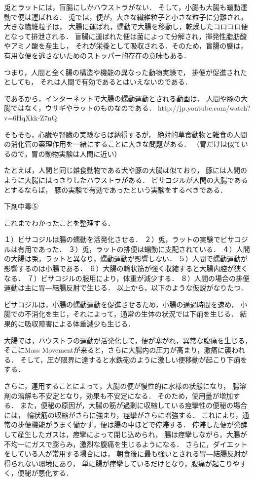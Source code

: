 兎とラットには，盲腸にしかハウストラがない．
そして，小腸も大腸も蠕動運動で便は運ばれる．
兎では，便が，大きな繊維粒子と小さな粒子に分離され，大きな繊維粒子は，
大腸に運ばれ，蠕動で大腸を移動し，乾燥したコロコロ便となって排泄される．
盲腸に運ばれた便は菌によって分解され，揮発性脂肪酸やアミノ酸を産生し，
それが栄養として吸収される．そのため，盲腸の襞は，有用な便を逃さないためのストッパー的存在の意味もある．

つまり，人間と全く腸の構造や機能の異なった動物実験で，
排便が促進されたとしても，
それは人間で有効であるとはいえないのである．

であるから，インターネットで大腸の蠕動運動とされる動画は，
人間や豚の大腸ではなく，ウサギやラットのものなのである．
http://jp.youtube.com/watch?v=6HqXkk-Z7nQ 

そもそも，心臓や腎臓の実験ならば納得するが，
絶対的草食動物と雑食の人間の消化管の薬理作用を一緒にすることに大きな問題がある．
（胃だけは似ているので，胃の動物実験は人間に近い）




たとえば，人間と同じ雑食動物である犬や豚の大腸は似ており，
豚には人間のように大腸にはっきりしたハウストラがある．
ビサコジルが人間の大腸であるとするならば，
豚の実験で有効であったという実験をするべきである．

下剤中毒⑤

これまでわかったことを整理する．

１）ビサコジルは腸の蠕動を活発化させる．
２）兎，ラットの実験でビサコジルは有用であった．
３）兎，ラットの排便は蠕動に支配されている．
４）人間の大腸は兎，ラットと異なり，蠕動運動が影響しない．
５）人間で蠕動運動が影響するのは小腸である．
６）大腸の輪状筋が強く収縮すると大腸内腔が狭くなる．
７）ビサコジルの服用により，体重が減少する．
８）人間の場合の排便運動は主に胃―結腸反射で生じる．
以上から，以下のような仮説がなりたつ．

ビサコジルは，小腸の蠕動運動を促進させるため，小腸の通過時間を速め，
小腸での不消化を生じ，それによって，通常の生体の状況では下痢を生じる．
結果的に吸収障害による体重減少も生じる．

大腸では，ハウストラの運動が活発化して，便が塞がれ，異常な腹痛を生じる，
 そこにMass Movementが来ると，さらに大腸内の圧力が高まり，激痛に襲われる．
そして，圧が限界に達すると水鉄砲のように激しい便移動が起こり下痢をする．

さらに，連用することによって，大腸の便が慢性的に水様の状態になり，
腸溶剤の溶解も不安定となり，効果も不安定になる．
そのため，使用量が増加する．
また，便秘の原因が，大腸の筋が過剰に収縮している痙攣性の便秘の場合には，
輪状筋の収縮がさらに強まり，痙攣がさらに増強する．
これにより，通常の排便機能がうまく働かず，便は腸の中ほどで停滞する．
停滞した便が発酵して産生したガスは，痙攣によって閉じ込められ，
腸は痙攣しながら，大腸が不均一にガスで膨らみ，激烈な腹痛を生じるようになる．
さらに，ダイエットをしている人が常用する場合には，
朝食後に最も強いとされる胃―結腸反射が得られない環境にあり，
単に腸が痙攣しているだけとなり，腹痛が起こりやすく，便秘が悪化する．

